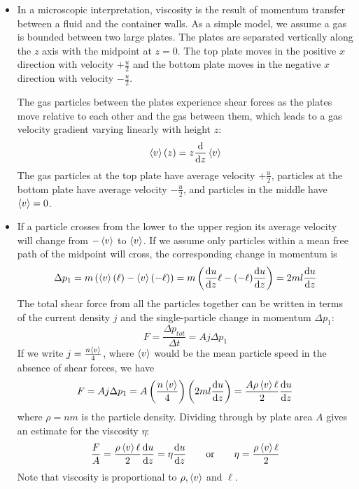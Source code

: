 \documentclass[11pt, a4paper]{article}
\newcommand{\eqtext}[1]{\qquad \text{#1} \qquad}
\begin{document}
\begin{itemize}
	\item In a microscopic interpretation, viscosity is the result of momentum transfer between a fluid and the container walls. As a simple model, we assume a gas is bounded between two large plates. The plates are separated vertically along the $ z $ axis with the midpoint at $ z = 0 $. The top plate moves in the positive $ x $ direction with velocity $ +\frac{u}{2} $ and the bottom plate moves in the negative $ x $ direction with velocity $ -\frac{u}{2} $. 
	
	The gas particles between the plates experience shear forces as the plates move relative to each other and the gas between them, which leads to a gas velocity gradient varying linearly with height $ z $:
	\begin{equation*}
		\expval{v}(z) = z \dv{}{z}\expval{v}
	\end{equation*}
	The gas particles at the top plate have average velocity $ +\frac{u}{2} $, particles at the bottom plate have average velocity $ -\frac{u}{2} $, and particles in the middle have $ \expval{v} = 0 $.
	
	\item If a particle crosses from the lower to the upper region its average velocity will change from $ -\expval{v} $ to $ \expval{v} $. If we assume only particles within a mean free path of the midpoint will cross, the corresponding change in momentum is
	\begin{equation*}
		\Delta p_{1} = m\left(\expval{v}(\ell) - \expval{v}(-\ell) \right) = m \left(\dv{u}{z}\ell - (-\ell) \dv{u}{z}\right) = 2 ml \dv{u}{z}
	\end{equation*}
	The total shear force from all the particles together can be written in terms of the current density $ j $ and the single-particle change in momentum $ \Delta p_{1} $:
	\begin{equation*}
		F = \frac{\Delta p_{tot}}{\Delta t} = A j \Delta p_{1}
	\end{equation*}
	If we write $ j = \frac{n \expval{v}}{4} $, where $ \expval{v} $ would be the mean particle speed in the absence of shear forces, we have
	\begin{equation*}
		F = A j \Delta p_{1} = A \left(\frac{n \expval{v}}{4}\right) \left(2 ml \dv{u}{z}\right) = \frac{A\rho \expval{v}\ell}{2} \dv{u}{z}
	\end{equation*}
	where $ \rho = n m $ is the particle density. Dividing through by plate area $ A $ gives an estimate for the viscosity $ \eta $:
	\begin{equation*}
		\frac{F}{A} = \frac{\rho \expval{v}\ell}{2} \dv{u}{z} = \eta \dv{u}{z} \eqtext{or} \eta = \frac{\rho \expval{v}\ell}{2}
	\end{equation*}
	Note that viscosity is proportional to $ \rho, \expval{v} $ and $ \ell $.
\end{itemize}
\end{document}
